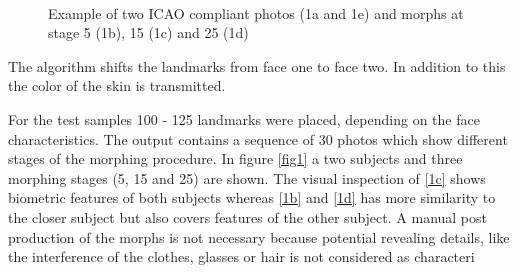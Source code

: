 \cite{vukadinovic2005fully}
\begin{figure} 
	\centering
	\label{1a}\hfill
	\label{1b}\\
	\caption{Example of two ICAO compliant photos (1a and 1e) and morphs at stage 5 (1b), 15 (1c) and 25 (1d)}
	\label{fig:manual_morph} 
\end{figure}


The algorithm shifts the landmarks from face one to face two. In addition to this the color of the skin is transmitted. 

For the test samples 100 - 125 landmarks were placed, depending on the face characteristics. The output contains a sequence of 30 photos which show different stages of the morphing procedure. 
In figure \ref{fig1} a two subjects and three morphing stages (5, 15 and 25) are shown. The visual inspection of \ref{1c} shows biometric features of both subjects whereas \ref{1b} and \ref{1d} has more similarity to the closer subject but also covers features of the other subject.
A manual post production of the morphs is not necessary because potential revealing details, like the interference  of the clothes, glasses or hair is not considered as characteri


